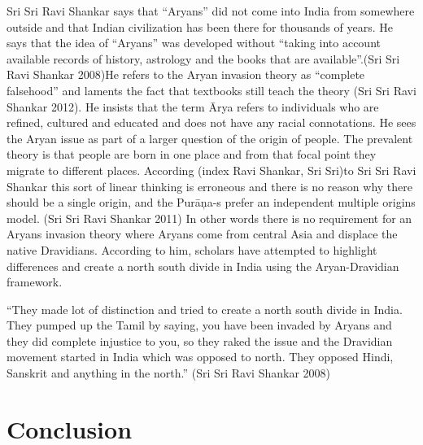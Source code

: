 Sri Sri Ravi Shankar says that “Aryans” did not come into India from somewhere outside and that Indian civilization has been there for thousands of years. He says that the idea of “Aryans” was developed without “taking into account available records of history, astrology and the books that are available”.(Sri Sri Ravi Shankar 2008)He refers to the Aryan invasion theory as “complete falsehood” and laments the fact that textbooks still teach the theory (Sri Sri Ravi Shankar 2012). He insists that the term Ārya refers to individuals who are refined, cultured and educated and does not have any racial connotations. He sees the Aryan issue as part of a larger question of the origin of people. The prevalent theory is that people are born in one place and from that focal point they migrate to different places. According (index Ravi Shankar, Sri Sri)to Sri Sri Ravi Shankar this sort of linear thinking is erroneous and there is no reason why there should be a single origin, and the Purāņa-s prefer an independent multiple origins model. (Sri Sri Ravi Shankar 2011) In other words there is no requirement for an Aryans invasion theory where Aryans come from central Asia and displace the native Dravidians. According to him, scholars have attempted to highlight differences and create a north south divide in India using the Aryan-Dravidian framework.

\begin{myquote}
“They made lot of distinction and tried to create a north south divide in India. They pumped up the Tamil by saying, you have been invaded by Aryans and they did complete injustice to you, so they raked the issue and the Dravidian movement started in India which was opposed to north. They opposed Hindi, Sanskrit and anything in the north.” (Sri Sri Ravi Shankar 2008)
\end{myquote}


\section*{Conclusion}

